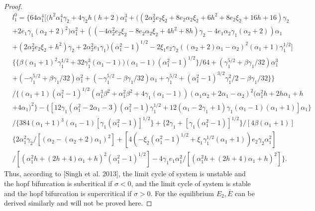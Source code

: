 \documentclass{ws-ijbc}
\begin{document}
\begin{proof}
\begin{equation*}
\begin{aligned}
 &l_{1}^{0}=\{64 \alpha_{1}^{4} [(h^{2} \alpha_{1}^{4} \gamma_{2}+4 \gamma_{2} h \left(h +2\right) \alpha_{1}^{3}+(\left(2 \alpha_{2}^{2} e_{2} \xi_{2}+8 e_{2} \alpha_{2}\xi_{2}+6 h^{2}+8 e_{2} \xi_{2}+16 h +16\right) \gamma_{2}\\
&+2 e_{1} \gamma_{1} \left(\alpha_{2}+2\right)^{2}) \alpha_{1}^{2}
+\left(\left(-4 \alpha_{2}^{2} e_{2} \xi_{2}-8 e_{2} \alpha_{2} \xi_{2}+4 h^{2}+8 h \right) \gamma_{2}-4 e_{1} \alpha_{2} \gamma_{1} \left(\alpha_{2}+2\right)\right) \alpha_{1}\\
&+\left(2 \alpha_{2}^{2} e_{2} \xi_{2}+h^{2}\right) \gamma_{2}+2 \alpha_{2}^{2} e_{1} \gamma_{1})(\alpha_{1}^{2}-1)^{1/2}
-2 \xi_{1} e_{2} \gamma_{2} \left(\left(\alpha_{2}+2\right) \alpha_{1}-\alpha_{2}\right)^{2} \left(\alpha_{1}+1\right)\gamma_{1}^{1/2}]\\
&\{\{\beta\left(\alpha_{1}+1\right)^{2}\gamma_{1}^{1/2}+32 \gamma_{1}^{3} \left(\alpha_{1}-1\right)) \left(\alpha_{1}-1\right) (\alpha_{1}^{2}-1)^{1/2}\}/64+(\gamma_{1}^{5/2}
+ \beta\gamma_{1}/32)\alpha_{1}^{3}\\
&+(-\gamma_{1}^{5/2}+\beta\gamma_{1}/32)\alpha_{1}^{2}
+(-\gamma_{1}^{5/2}-\beta\gamma_{1}/32)\alpha_{1}
+\gamma_{1}^{5/2}+\left(\alpha_{1}^{2}-1\right)^{3/2}\gamma_{1}^{2}/2
-\beta \gamma_{1}/32\}\}\\
&/\{\left(\alpha_{1}+1\right)(\alpha_{1}^{2}-1)^{1/2}(\alpha_{1}^{3} \beta^{2}+\alpha_{1}^{2} \beta^{2}
+4 \gamma_{1} (\alpha_{1}-1))(\alpha_{1} \alpha_{2}+2 \alpha_{1}-\alpha_{2})^{2}(\alpha_{1}^{2} h +2 h \alpha_{1}+h\\
 &+4 \alpha_{1})^{2}\}-\{[12 \gamma_{1} \left(\alpha_{1}^{2}-2 \alpha_{1}-3\right) (\alpha_{1}^{2}-1)\gamma_{1}^{1/2}+12 \left(\alpha_{1}-2\gamma_{1}+1\right) \gamma_{1} \left(\alpha_{1}-1\right)\left(\alpha_{1}+1\right)] \alpha_{1}\}\\
  &/\{384 \left(\alpha_{1}+1\right)^{3} \left(\alpha_{1}-1\right)
[\gamma_{1}(\alpha_{1}^{2}-1)]^{1/2}\}+\{2 \gamma_{1}+[\gamma_{1}(\alpha_{1}^{2}-1)]^{1/2}\}
/[{4 \beta \left(\alpha_{1}+1\right)}]\\
&\{2 \alpha_{1}^{2} \gamma_{2}/[\left(\alpha_{2}-\left(\alpha_{2}+2\right) \alpha_{1}\right)^{2}]+[4(-\xi_{2}(\alpha_{1}^{2}-1)^{1/2}+\xi_{1} \gamma_{1}^{1/2}\left(\alpha_{1}+1\right)) e_{2}
\gamma_{2}\alpha_{1}^{2}]\\
&/[(\alpha_{1}^{2} h+\left(2 h +4\right) \alpha_{1}+h)^{2} (\alpha_{1}^{2}-1)^{1/2}]
-4 \gamma_{1} e_{1} \alpha_{1}^{2}/[\left(\alpha_{1}^{2} h +\left(2 h +4\right) \alpha_{1}+h \right)^{2}]\}.
\end{aligned}
\end{equation*}
Thus, according to [Singh et al. 2013], the limit cycle of system is unstable and the hopf bifurcation is subcritical if $\sigma<0$, and the limit cycle of system is stable and the hopf bifurcation is supercritical if $\sigma>0$. For the equilibrium $E_{2},\bar E$ can be derived similarly and will not be proved here.
\end{proof}
\end{document}
